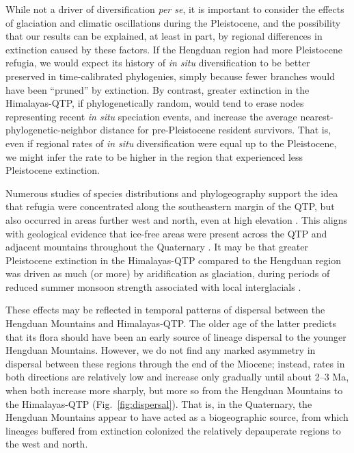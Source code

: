 
While not a driver of diversification \textit{per se}, it is important
to consider the effects of glaciation and climatic oscillations during
the Pleistocene, and the possibility that our results can be
explained, at least in part, by regional differences in extinction
caused by these factors. If the Hengduan region had more Pleistocene
refugia, we would expect its history of \textit{in situ}
diversification to be better preserved in time-calibrated phylogenies,
simply because fewer branches would have been ``pruned'' by
extinction. By contrast, greater extinction in the Himalayas-QTP, if
phylogenetically random, would tend to erase nodes representing recent
\textit{in situ} speciation events, and increase the average
nearest-phylogenetic-neighbor distance for pre-Pleistocene resident
survivors. That is, even if regional rates of \textit{in situ}
diversification were equal up to the Pleistocene, we might infer the
rate to be higher in the region that experienced less Pleistocene
extinction.

Numerous studies of species distributions
\citep[e.g.,][]{srinivasan2014,lopez2011} and phylogeography
\citep[e.g.,][]{CunY2010,WangBS2011,lei2014,meng2015} support the idea
that refugia were concentrated along the southeastern margin of the
QTP, but also occurred in areas further west and north, even at high
elevation \citep[e.g.,][]{wang2009,sun2010,opgenoorth2010}. This
aligns with geological evidence that ice-free areas were present
across the QTP and adjacent mountains throughout the Quaternary
\citep[see][]{owen2014}. It may be that greater Pleistocene extinction
in the Himalayas-QTP compared to the Hengduan region was driven as
much (or more) by aridification as glaciation, during periods of
reduced summer monsoon strength associated with local interglacials
\citep{owen2008}.

These effects may be reflected in temporal patterns of dispersal
between the Hengduan Mountains and Himalayas-QTP. The older age of the
latter predicts that its flora should have been an early source of
lineage dispersal to the younger Hengduan Mountains. However, we do
not find any marked asymmetry in dispersal between these regions
through the end of the Miocene; instead, rates in both directions are
relatively low and increase only gradually until about 2--3 Ma, when
both increase more sharply, but more so from the Hengduan Mountains to
the Himalayas-QTP (Fig.~\ref{fig:dispersal}). That is, in the
Quaternary, the Hengduan Mountains appear to have acted as a
biogeographic source, from which lineages buffered from extinction
colonized the relatively depauperate regions to the west and
north. %

